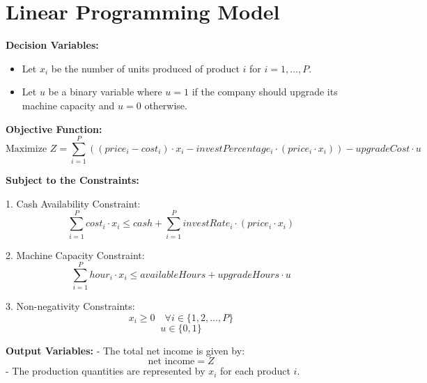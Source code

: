 \documentclass{article}
\begin{document}
\section*{Linear Programming Model}

\textbf{Decision Variables:}
\begin{itemize}
    \item Let \( x_i \) be the number of units produced of product \( i \) for \( i = 1, \ldots, P \).
    \item Let \( u \) be a binary variable where \( u = 1 \) if the company should upgrade its machine capacity and \( u = 0 \) otherwise.
\end{itemize}

\textbf{Objective Function:}
\[
\text{Maximize } Z = \sum_{i=1}^{P} \left( (price_i - cost_i) \cdot x_i - investPercentage_i \cdot (price_i \cdot x_i) \right) - upgradeCost \cdot u
\]

\textbf{Subject to the Constraints:}

1. Cash Availability Constraint:
\[
\sum_{i=1}^{P} cost_i \cdot x_i \leq cash + \sum_{i=1}^{P} investRate_i \cdot (price_i \cdot x_i)
\]

2. Machine Capacity Constraint:
\[
\sum_{i=1}^{P} hour_i \cdot x_i \leq availableHours + upgradeHours \cdot u
\]

3. Non-negativity Constraints:
\[
x_i \geq 0 \quad \forall i \in \{1, 2, \ldots, P\}
\]
\[
u \in \{0, 1\}
\]

\textbf{Output Variables:}
- The total net income is given by:
\[
\text{net income} = Z
\]
- The production quantities are represented by \( x_i \) for each product \( i \).
\end{document}
